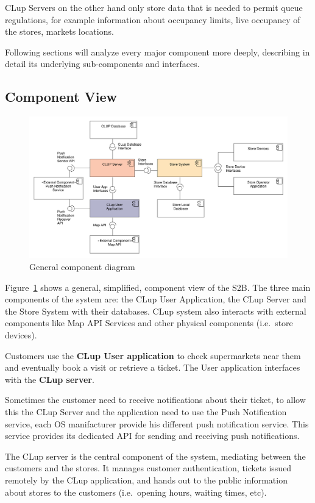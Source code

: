 CLup Servers on the other hand only store data that is needed to permit queue regulations, for example information about occupancy limits, live occupancy of the stores, markets locations.

Following sections will analyze every major component more deeply, describing in detail its underlying sub-components and interfaces.  

\subsection{Component View}\label{sect:component_view}
\begin{figure}[H]
    \includegraphics[width=\textwidth]{Images/UML_general_component.pdf}
    \caption{\label{fig:UML_comp_general}General component diagram}
\end{figure}
Figure~\ref{fig:UML_comp_general} shows a general, simplified, component view of the S2B.
The three main components of the system are: the CLup User Application, the CLup Server and the Store System with their databases. CLup system also interacts with external components like Map API Services and other physical components (i.e.~store devices).

Customers use the \textbf{CLup User application} to check supermarkets near them and eventually book a visit or retrieve a ticket. The User application interfaces with the \textbf{CLup server}. 

Sometimes the customer need to receive notifications about their ticket, to allow this the CLup Server and the application need to use the Push Notification service, each OS manifacturer provide his different push notification service. This service provides its dedicated API for sending and receiving push notifications.

The CLup server is the central component of the system, mediating between the customers and the stores. It manages customer authentication, tickets issued remotely by the CLup application, and hands out to the public information about stores to the customers (i.e.~opening hours, waiting times, etc). 

